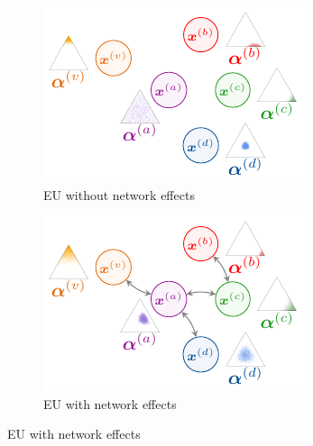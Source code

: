 \begin{figure}[!h]
\begin{subfigure}[t]{0.495\textwidth}
		\label{subfig:au_with_network_large}
	\end{subfigure}
	\begin{subfigure}[t]{0.495\textwidth}
	    \centering
		\includegraphics[width=\textwidth]{resources/no-network-epistemic.pdf}
		\caption{EU without network effects}
		\label{subfig:eu_without_network_large}
	\end{subfigure}
	\begin{subfigure}[t]{0.495\textwidth}
	    \centering
		\includegraphics[width=\textwidth]{resources/network-epistemic.pdf}
		\caption{EU with network effects}
		\label{subfig:eu_with_network_large}
	\end{subfigure}

\end{figure}
